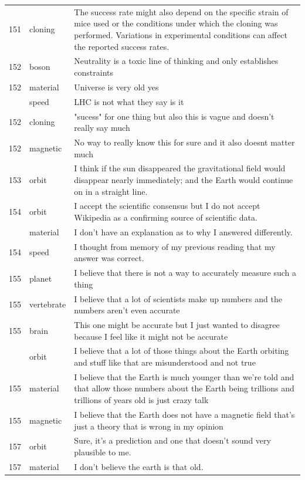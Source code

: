 \documentclass[
  doc,floatsintext]{apa6}
\begin{document}
\begin{longtable}[t]{>{}r>{}l>{\raggedright\arraybackslash}p{30em}}
151 & cloning & The success rate might also depend on the specific strain of mice used or the conditions under which the cloning was performed. Variations in experimental conditions can affect the reported success rates.\\
152 & boson & Neutrality is a toxic line of thinking and only establishes constraints\\
152 & material & Universe is very old yes\\
\addlinespace
152 & speed & LHC is not what they say is it\\
152 & cloning & "sucess" for one thing but also this is vague and doesn't really say much\\
152 & magnetic & No way to really know this for sure and it also doesnt matter much\\
153 & orbit & I think if the sun disappeared the gravitational field would disappear nearly immediately; and the Earth would continue on in a straight line.\\
154 & orbit & I accept the scientific consensus but I do not accept Wikipedia as a confirming source of scientific data.\\
\addlinespace
154 & material & I don't have an explanation as to why I answered differently.\\
154 & speed & I thought from memory of my previous reading that my answer was correct.\\
155 & planet & I believe that there is not a way to accurately measure such a thing\\
155 & vertebrate & I believe that a lot of scientists make up numbers and the numbers aren't even accurate\\
155 & brain & This one might be accurate but I just wanted to disagree because I feel like it might not be accurate\\
\addlinespace
155 & orbit & I believe that a lot of those things about the Earth orbiting and stuff like that are misunderstood and not true\\
155 & material & I believe that the Earth is much younger than we're told and that allow those numbers about the Earth being trillions and trillions of years old is just crazy talk\\
155 & magnetic & I believe that the Earth does not have a magnetic field that's just a theory that is wrong in my opinion\\
157 & orbit & Sure, it's a prediction and one that doesn't sound very plausible to me.\\
157 & material & I don't believe the earth is that old.\\

\end{longtable}
\end{document}
